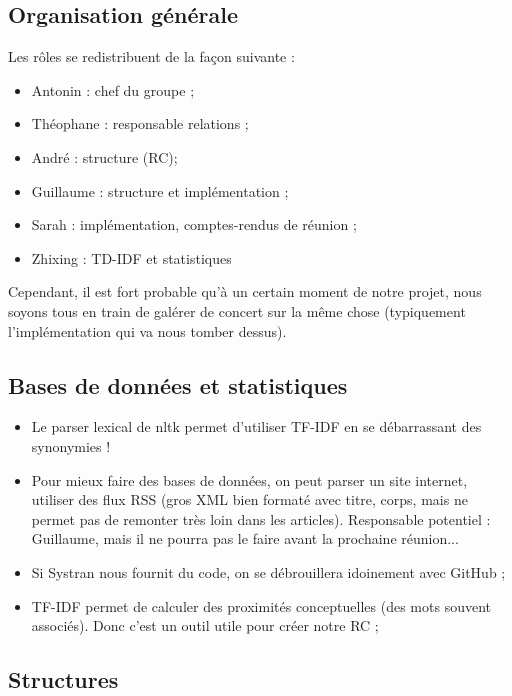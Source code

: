 \documentclass{article}
\begin{document}
\subsection{Organisation générale}

Les rôles se redistribuent de la façon suivante :
\begin{itemize}
 \item Antonin : chef du groupe ;
 \item Théophane : responsable relations ;
 \item André : structure (RC);
 \item Guillaume : structure et implémentation ;
 \item Sarah : implémentation, comptes-rendus de réunion ;
 \item Zhixing : TD-IDF et statistiques
\end{itemize}
Cependant, il est fort probable qu'à un certain moment de notre projet, nous soyons tous en train de galérer de concert sur la même chose (typiquement l'implémentation qui va nous tomber dessus).

\subsection{Bases de données et statistiques}

\begin{itemize}
 \item Le parser lexical de nltk permet d'utiliser TF-IDF en se débarrassant des synonymies !
 \item Pour mieux faire des bases de données, on peut parser un site internet, utiliser des flux RSS (gros XML bien formaté avec titre, corps, mais ne permet pas de remonter très loin dans les articles). Responsable potentiel : Guillaume, mais il ne pourra pas le faire avant la prochaine réunion...
 \item Si Systran nous fournit du code, on se débrouillera idoinement avec GitHub ;
 \item TF-IDF permet de calculer des proximités conceptuelles (des mots souvent associés). Donc c'est un outil utile pour créer notre RC ;
\end{itemize}


\subsection{Structures}
\end{document}
